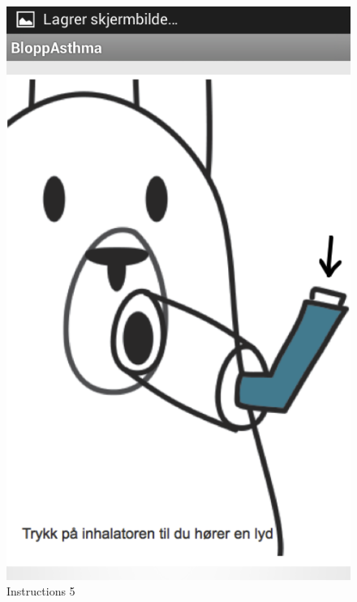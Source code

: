 \begin{figure}
\begin{minipage}[b]{0.3\linewidth}
		\includegraphics[width=0.20\paperwidth]{Pictures/app-screenshots/instructions-5.png}
		\caption{Instructions 5}
		\label{fig:instructions-5}
	\end{minipage}
	\begin{minipage}[b]{0.3\linewidth}
		\centering

\end{minipage}
\end{figure}
